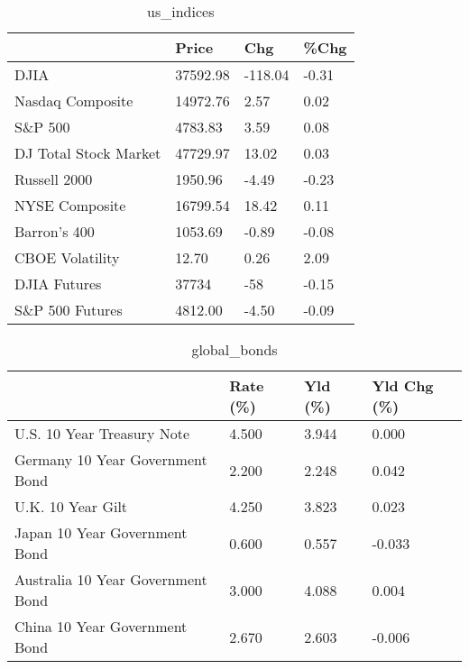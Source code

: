 \documentclass{article}%
\begin{document}
%


\begin{table}[htbp]%
\caption{us\_indices}%
\centering%
\begin{adjustbox}{width=1\textwidth}%
\begin{tabular}{llll}
\toprule
                      &    Price &     Chg &  \%Chg \\
\midrule
                 DJIA & 37592.98 & -118.04 & -0.31 \\
     Nasdaq Composite & 14972.76 &    2.57 &  0.02 \\
              S\&P 500 &  4783.83 &    3.59 &  0.08 \\
DJ Total Stock Market & 47729.97 &   13.02 &  0.03 \\
         Russell 2000 &  1950.96 &   -4.49 & -0.23 \\
       NYSE Composite & 16799.54 &   18.42 &  0.11 \\
         Barron's 400 &  1053.69 &   -0.89 & -0.08 \\
      CBOE Volatility &    12.70 &    0.26 &  2.09 \\
         DJIA Futures &    37734 &     -58 & -0.15 \\
      S\&P 500 Futures &  4812.00 &   -4.50 & -0.09 \\
\bottomrule
\end{tabular}
%
\end{adjustbox}%
\end{table}

%


\begin{table}[htbp]%
\caption{global\_bonds}%
\centering%
\begin{adjustbox}{width=1\textwidth}%
\begin{tabular}{llll}
\toprule
                                  & Rate (\%) & Yld (\%) & Yld Chg (\%) \\
\midrule
       U.S. 10 Year Treasury Note &    4.500 &   3.944 &       0.000 \\
  Germany 10 Year Government Bond &    2.200 &   2.248 &       0.042 \\
                U.K. 10 Year Gilt &    4.250 &   3.823 &       0.023 \\
    Japan 10 Year Government Bond &    0.600 &   0.557 &      -0.033 \\
Australia 10 Year Government Bond &    3.000 &   4.088 &       0.004 \\
    China 10 Year Government Bond &    2.670 &   2.603 &      -0.006 \\
\bottomrule
\end{tabular}
%
\end{adjustbox}%
\end{table}
\end{document}
